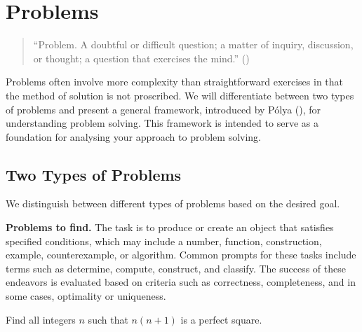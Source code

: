 \documentclass[
  a4paper,
  DIV=11,
  numbers=noendperiod,
  oneside]{scrreprt}
\begin{document}
\chapter{Problems}\label{sec-problems}

\begin{quote}
``Problem. A doubtful or difficult question; a matter of inquiry,
discussion, or thought; a question that exercises the mind.''
()
\end{quote}

Problems often involve more complexity than straightforward exercises in
that the method of solution is not proscribed. We will differentiate
between two types of problems and present a general framework,
introduced by Pólya (), for
understanding problem solving. This framework is intended to serve as a
foundation for analysing your approach to problem solving.

\section{Two Types of Problems}\label{two-types-of-problems}

We distinguish between different types of problems based on the desired
goal.

\textbf{Problems to find.} The task is to produce or create an object
that satisfies specified conditions, which may include a number,
function, construction, example, counterexample, or algorithm. Common
prompts for these tasks include terms such as determine, compute,
construct, and classify. The success of these endeavors is evaluated
based on criteria such as correctness, completeness, and in some cases,
optimality or uniqueness.

\begin{tcolorbox}[enhanced jigsaw, breakable, colframe=quarto-callout-note-color-frame, leftrule=.75mm, arc=.35mm, toptitle=1mm, rightrule=.15mm, left=2mm, colbacktitle=quarto-callout-note-color!10!white, bottomtitle=1mm, titlerule=0mm, bottomrule=.15mm, toprule=.15mm, coltitle=black, opacityback=0, title=\textcolor{quarto-callout-note-color}{\faInfo}\hspace{0.5em}{Example of a problem to find}, opacitybacktitle=0.6, colback=white]

Find all integers \(n\) such that \(n(n+1)\) is a perfect square.

\end{tcolorbox}
\end{document}
